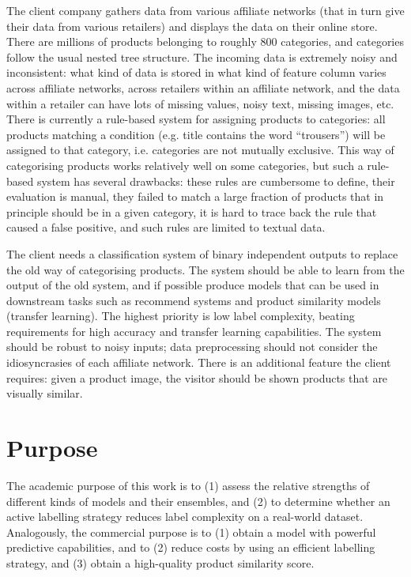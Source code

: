 The client company gathers data from various affiliate networks (that in turn give their data from various retailers) and displays the data on their online store.
There are millions of products belonging to roughly 800 categories, and categories follow the usual nested tree structure.
The incoming data is extremely noisy and inconsistent: what kind of data is stored in what kind of feature column varies across affiliate networks, across retailers within an affiliate network, and the data within a retailer can have lots of missing values, noisy text, missing images, etc.
There is currently a rule-based system for assigning products to categories: all products matching a condition (e.g. title contains the word ``trousers'') will be assigned to that category, i.e. categories are not mutually exclusive.
This way of categorising products works relatively well on some categories, but such a rule-based system has several drawbacks: these rules are cumbersome to define, their evaluation is manual, they failed to match a large fraction of products that in principle should be in a given category, it is hard to trace back the rule that caused a false positive, and such rules are limited to textual data.

The client needs a classification system of binary independent outputs to replace the old way of categorising products.
The system should be able to learn from the output of the old system, and if possible produce models that can be used in downstream tasks such as recommend systems and product similarity models (transfer learning).
The highest priority is low label complexity, beating requirements for high accuracy and transfer learning capabilities.
The system should be robust to  noisy inputs; data preprocessing should not consider the idiosyncrasies of each affiliate network.
There is an additional feature the client requires: given a product image, the visitor should be shown products that are visually similar.

\section{Purpose}

The academic purpose of this work is to (1) assess the relative strengths of different kinds of models and their ensembles, and (2) to determine whether an active labelling strategy reduces label complexity on a real-world dataset. Analogously, the commercial purpose is to (1) obtain a model with powerful predictive capabilities, and to (2) reduce costs by using an efficient labelling strategy, and (3) obtain a high-quality product similarity score.

